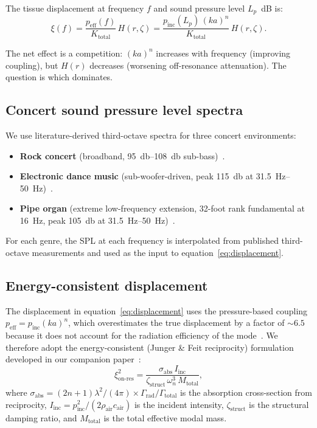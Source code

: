 The tissue displacement at frequency $f$ and sound pressure level
$L_p$~dB is:
%
\begin{equation}
  \xi(f) = \frac{p_\mathrm{eff}(f)}{K_\mathrm{total}} \, H(r, \zeta)
  = \frac{p_\mathrm{inc}(L_p)\,(ka)^n}{K_\mathrm{total}} \, H(r, \zeta).
  \label{eq:displacement}
\end{equation}

The net effect is a competition: $(ka)^n$ increases with frequency
(improving coupling), but $H(r)$ decreases (worsening off-resonance
attenuation).  The question is which dominates.

\subsection{Concert sound pressure level spectra}
\label{sec:concert-spl}

We use literature-derived third-octave spectra for three concert
environments:
%
\begin{itemize}
  \item \textbf{Rock concert} (broadband, \SIrange{95}{108}{\decibel}
    sub-bass)~\cite{Gunderson2016}.
  \item \textbf{Electronic dance music} (sub-woofer-driven, peak
    \SI{115}{\decibel} at \SIrange{31.5}{50}{\hertz})~\cite{Opperman2006}.
  \item \textbf{Pipe organ} (extreme low-frequency extension, 32-foot
    rank fundamental at \SI{16}{\hertz}, peak \SI{105}{\decibel} at
    \SIrange{31.5}{50}{\hertz})~\cite{Bickerdike1966}.
\end{itemize}

For each genre, the SPL at each frequency is interpolated from published
third-octave measurements and used as the input to
equation~\eqref{eq:displacement}.

\subsection{Energy-consistent displacement}
\label{sec:energy-consistent}

The displacement in equation~\eqref{eq:displacement} uses the
pressure-based coupling $p_\mathrm{eff} = p_\mathrm{inc}(ka)^n$, which
overestimates the true displacement by a factor of ${\sim}6.5$ because it
does not account for the radiation efficiency of the
mode~\cite{Junger2012}.  We therefore adopt the energy-consistent
(Junger \& Feit reciprocity) formulation developed in our companion
paper~\cite{Mace2026browntone}:
%
\begin{equation}
  \xi_\mathrm{on\text{-}res}^2 =
    \frac{\sigma_\mathrm{abs}\,I_\mathrm{inc}}
         {\zeta_\mathrm{struct}\,\omega_n^3\,M_\mathrm{total}},
  \label{eq:energy-consistent}
\end{equation}
%
where $\sigma_\mathrm{abs} = (2n+1)\lambda^2/(4\pi) \times
\Gamma_\mathrm{rad}/\Gamma_\mathrm{total}$ is the absorption
cross-section from reciprocity, $I_\mathrm{inc} = p_\mathrm{inc}^2 /
(2\rho_\mathrm{air}c_\mathrm{air})$ is the incident intensity,
$\zeta_\mathrm{struct}$ is the structural damping ratio, and
$M_\mathrm{total}$ is the total effective modal mass.

